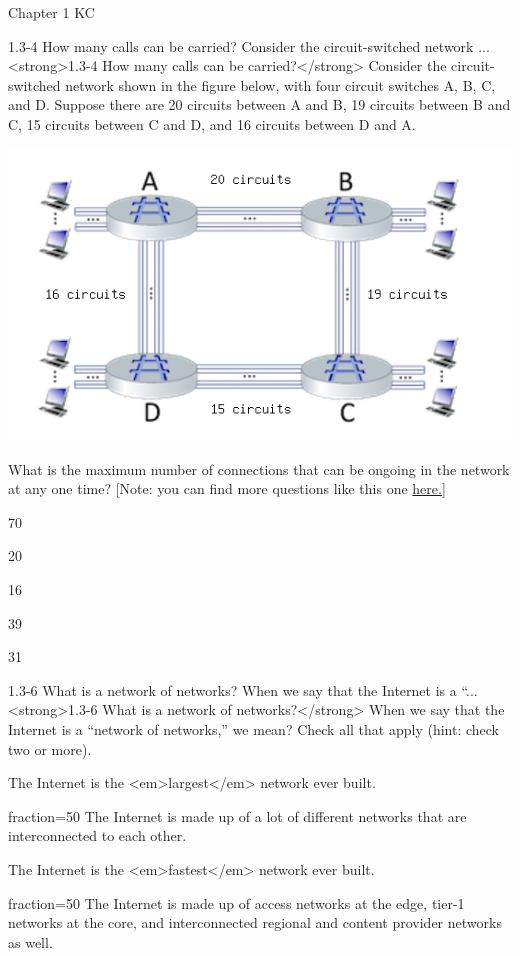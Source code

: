 \documentclass[a4paper]{article}
\begin{document}
\begin{quiz}{Chapter 1 KC}
\begin{multi}[points=1]{1.3-4 How many calls can be carried? Consider the circuit-switched network ...}
<strong>1.3-4 How many calls can be carried?</strong> Consider the circuit-switched network shown in the figure below, with  four circuit switches A, B, C, and D. Suppose there are 20 circuits between A and B, 19 circuits between B and C, 15 circuits between C and D, and 16 circuits between D and A. 
\begin{center}
\includegraphics[width=\linewidth]{figs/1.3.4.png}
\end{center}
 What is the maximum number of connections that can be ongoing in the network at any one time? [Note: you can find more questions like this one \href{http://gaia.cs.umass.edu/kurose_ross/interactive/circuit_switching.php}{here.]}
\item* 70
\item 20
\item 16
\item 39
\item 31
\end{multi}

\begin{multi}[points=1,multiple]{1.3-6 What is a network of networks?  When we say that the Internet is a “...}
<strong>1.3-6 What is a network of networks?</strong>  When we say that the Internet is a “network of networks,” we mean? Check all that apply (hint: check two or more).
\item The Internet is the <em>largest</em> network ever built.
\item[fraction=50] The Internet is made up of a lot of different networks that are interconnected to each other.
\item The Internet is the <em>fastest</em> network ever built.
\item[fraction=50] The Internet is made up of access networks at the edge, tier-1 networks at the core, and interconnected regional and content provider networks as well.
\end{multi}


\end{quiz}
\end{document}
